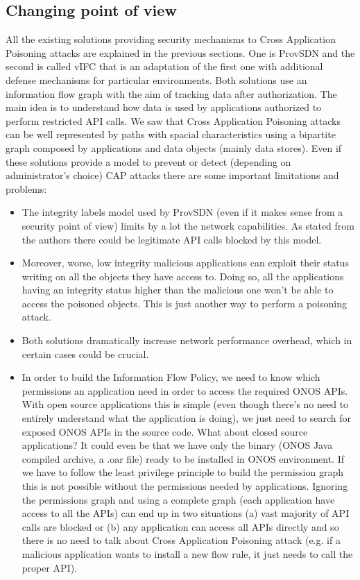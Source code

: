 \subsection{Changing point of view} 

All the existing solutions providing security mechanisms to Cross Application Poisoning attacks are explained in the previous sections. One is ProvSDN and the second is called vIFC that is an adaptation of the first one with additional defense mechanisms for particular environments. Both solutions use an information flow graph with the aim of tracking data after authorization. The main idea is to understand how data is used by applications authorized to perform restricted API calls. We saw that Cross Application Poisoning attacks can be well represented by paths with spacial characteristics using a bipartite graph composed by applications and data objects (mainly data stores). Even if these solutions provide a model to prevent or detect (depending on administrator's choice) CAP attacks there are some important limitations and problems:

\begin{itemize}
    \item The integrity labels model used by ProvSDN (even if it makes sense from a security point of view) limits by a lot the network capabilities. As stated from the authors there could be legitimate API calls blocked by this model. 
    \item Moreover, worse, low integrity malicious applications can exploit their status writing on all the objects they have access to. Doing so, all the applications having an integrity status higher than the malicious one won't be able to access the poisoned objects. This is just another way to perform a poisoning attack.
    \item Both solutions dramatically increase network performance overhead, which in certain cases could be crucial. 
    \item In order to build the Information Flow Policy, we need to know which permissions an application need in order to access the required ONOS APIs. With open source applications this is simple (even though there's no need to entirely understand what the application is doing), we just need to search for exposed ONOS APIs in the source code. What about closed source applications? It could even be that we have only the binary (ONOS Java compiled archive, a .oar file) ready to be installed in ONOS environment. If we have to follow the least privilege principle to build the permission graph this is not possible without the permissions needed by applications. Ignoring the permissions graph and using a complete graph (each application have access to all the APIs) can end up in two situations (a) vast majority of API calls are blocked or (b) any application can access all APIs directly and so there is no need to talk about Cross Application Poisoning attack (e.g. if a malicious application wants to install a new flow rule, it just needs to call the proper API).
\end{itemize}

